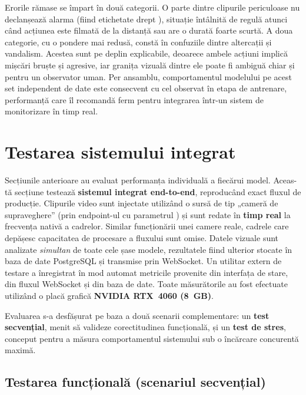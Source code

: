 \documentclass[../../main.tex]{subfiles}
\begin{document}
Erorile rămase se împart în două categorii. O parte dintre clipurile periculoase nu declanșează alarma (fiind etichetate drept ), situație întâlnită de regulă atunci când acțiunea este filmată de la distanță sau are o durată foarte scurtă. A doua categorie, cu o pondere mai redusă, constă în confuziile dintre altercații și vandalism. Acestea sunt pe deplin explicabile, deoarece ambele acțiuni implică mișcări bruște și agresive, iar granița vizuală dintre ele poate fi ambiguă chiar și pentru un observator uman. Per ansamblu, comportamentul modelului pe acest set independent de date este consecvent cu cel observat în etapa de antrenare, performanță care îl recomandă ferm pentru integrarea într-un sistem de monitorizare în timp real.

\section{Testarea sistemului integrat}
\label{sec:eval_sistem}

Secțiunile anterioare au evaluat performanța individuală a fiecărui model. Aceas-tă secțiune testează \textbf{sistemul integrat end-to-end}, reproducând exact fluxul de producție. Clipurile video sunt injectate utilizând o sursă de tip „cameră de supraveghere” (prin endpoint-ul  cu parametrul  ) și sunt redate în \textbf{timp real} la frecvența nativă a cadrelor. Similar funcționării unei camere reale, cadrele care depășesc capacitatea de procesare a fluxului sunt omise. Datele vizuale sunt analizate \textit{simultan} de toate cele șase modele, rezultatele fiind ulterior stocate în baza de date PostgreSQL și transmise prin WebSocket. Un utilitar extern de testare a înregistrat în mod automat metricile provenite din interfața de stare, din fluxul WebSocket și din baza de date. Toate măsurătorile au fost efectuate utilizând o placă grafică \textbf{NVIDIA RTX~4060 (8~GB)}.

Evaluarea s-a desfășurat pe baza a două scenarii complementare: un \textbf{test secvențial}, menit să valideze corectitudinea funcțională, și un \textbf{test de stres}, conceput pentru a măsura comportamentul sistemului sub o încărcare concurentă maximă.

\subsection{Testarea funcțională (scenariul secvențial)}
\label{subsec:sistem_secvential}
\end{document}
